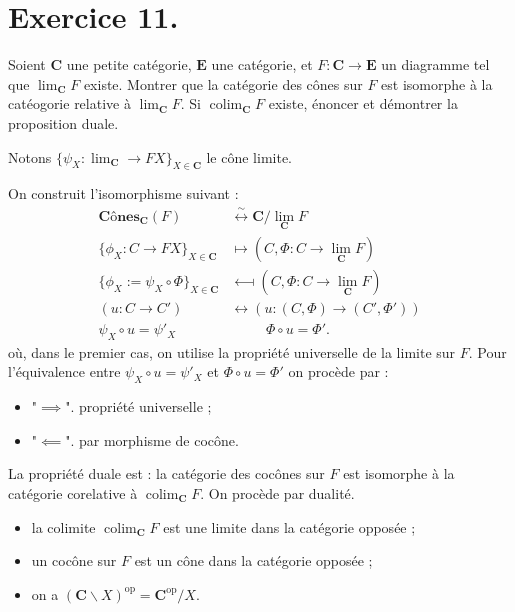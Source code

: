 \documentclass{../../td}
\newcommand\colim{\ensuremath{\operatorname{colim}}}
\begin{document}
  \chapter{Exercice 11.}
  
  \begin{slshape}
    \color{deepblue}
    Soient $\mathbf{C}$ une petite catégorie, $\mathbf{E}$ une catégorie, et $F : \mathbf{C} \to \mathbf{E}$ un diagramme tel que $\lim_\mathbf{C} F$ existe.
    Montrer que la catégorie des cônes sur $F$ est isomorphe à la catéogorie relative à $\lim_\mathbf{C} F$.
    Si $\colim_\mathbf{C} F$ existe, énoncer et démontrer la proposition duale.
  \end{slshape}

  Notons $\{\psi_X : \lim_\mathbf{C} \to F X\}_{X \in \mathbf{C}}$ le cône limite.

  On construit l'isomorphisme suivant :
  \begin{align*}
    \textbf{Cônes}_\mathbf{C}(F) &\overset \sim \longleftrightarrow \mathbf{C} / {\lim}_\mathbf{C} F \\
    \{\phi_X : C \to F X\}_{X \in \mathbf{C}} &\longmapsto (C, \Phi : C \to {\lim}_\mathbf{C} F)\\
    \{\phi_X := \psi_X \circ \Phi \}_{X \in \mathbf{C}} & \longmapsfrom (C, \Phi : C \to {\lim}_\mathbf{C} F)\\
    (u : C \to C') & \longleftrightarrow (u : (C, \Phi) \to (C', \Phi'))\\
    \psi_X \circ u = \psi'_X & \phantom{\longmapsto} \quad \Phi \circ u = \Phi'
  .\end{align*}
  où, dans le premier cas, on utilise la propriété universelle de la limite sur $F$.
  Pour l'équivalence entre $\psi_X \circ u = \psi'_X$ et  $\Phi \circ u = \Phi'$ on procède par :
  \begin{itemize}
    \item "$\implies$". propriété universelle ;
    \item "$\impliedby$". par morphisme de cocône.
  \end{itemize}

  La propriété duale est : la catégorie des cocônes sur $F$ est isomorphe à la catégorie corelative à $\colim_\mathbf{C} F$.
  On procède par dualité.
  \begin{itemize}
    \item la colimite $\colim_\mathbf{C} F$ est une limite dans la catégorie opposée ;
    \item un cocône sur $F$ est un cône dans la catégorie opposée ;
    \item on a $(\mathbf{C} \backslash X)^\mathrm{op} = \mathbf{C}^\mathrm{op}/ X$.
  \end{itemize}
\end{document}
